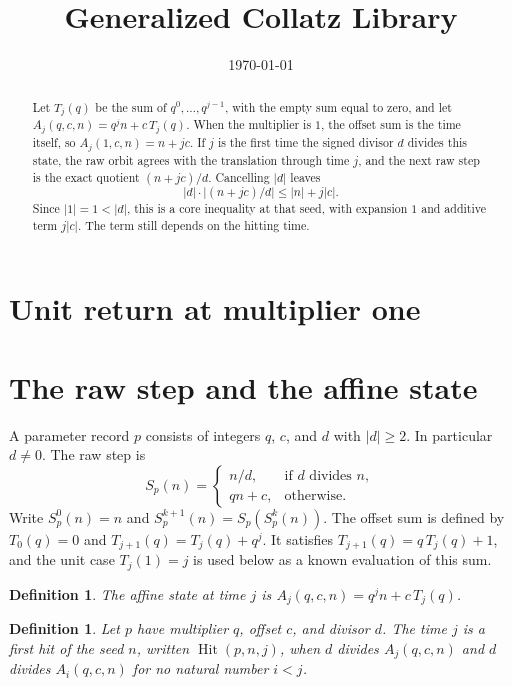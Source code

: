 \documentclass[11pt,letterpaper]{article}
\title{Generalized Collatz Library}
\author{}
\date{\today}
\newtheorem{definition}[theorem]{Definition}
\begin{document}
\maketitle
\section*{Unit return at multiplier one}

\begin{abstract}
Let \(T_j(q)\) be the sum of \(q^0,\dots,q^{j-1}\), with the empty sum equal to
zero, and let \(A_j(q,c,n)=q^j n+c\,T_j(q)\). When the multiplier is \(1\),
the offset sum is the time itself, so \(A_j(1,c,n)=n+jc\). If \(j\) is the
first time the signed divisor \(d\) divides this state, the raw orbit agrees
with the translation through time \(j\), and the next raw step is the exact
quotient \((n+jc)/d\). Cancelling \(|d|\) leaves
\[
|d|\cdot\bigl|(n+jc)/d\bigr|\le |n|+j|c|.
\]
Since \(|1|=1<|d|\), this is a core inequality at that seed, with expansion
\(1\) and additive term \(j|c|\). The term still depends on the hitting time.
\end{abstract}

\section{The raw step and the affine state}

A parameter record \(p\) consists of integers \(q\), \(c\), and \(d\) with
\(|d|\ge 2\). In particular \(d\neq 0\). The raw step is
\[
S_p(n)=
\begin{cases}
n/d, & \text{if \(d\) divides \(n\)},\\
qn+c, & \text{otherwise.}
\end{cases}
\]
Write \(S_p^{0}(n)=n\) and \(S_p^{k+1}(n)=S_p(S_p^{k}(n))\). The offset sum is
defined by \(T_0(q)=0\) and \(T_{j+1}(q)=T_j(q)+q^j\). It satisfies
\(T_{j+1}(q)=q\,T_j(q)+1\), and the unit case \(T_j(1)=j\) is used below as a
known evaluation of this sum.

\begin{definition}
\label{def:affine-state}
The affine state at time \(j\) is \(A_j(q,c,n)=q^j n+c\,T_j(q)\).
\end{definition}

\begin{definition}
\label{def:first-hit}
Let \(p\) have multiplier \(q\), offset \(c\), and divisor \(d\). The time
\(j\) is a first hit of the seed \(n\), written \(\operatorname{Hit}(p,n,j)\),
when \(d\) divides \(A_j(q,c,n)\) and \(d\) divides \(A_i(q,c,n)\) for no
natural number \(i<j\).
\end{definition}
\end{document}
